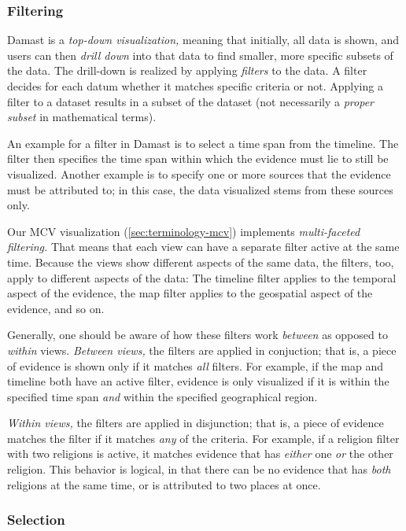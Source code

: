 \subsubsection{Filtering}
\label{sec:terminology-filtering}

Damast is a \emph{top-down visualization,} meaning that initially, all data is shown, and users can then \emph{drill down} into that data to find smaller, more specific subsets of the data.
The drill-down is realized by applying \emph{filters} to the data.
A filter decides for each datum whether it matches specific criteria or not.
Applying a filter to a dataset results in a subset of the dataset (not necessarily a \emph{proper subset} in mathematical terms).

An example for a filter in Damast is to select a time span from the timeline.
The filter then specifies the time span within which the evidence must lie to still be visualized.
Another example is to specify one or more sources that the evidence must be attributed to;
in this case, the data visualized stems from these sources only.

Our MCV visualization (\cref{sec:terminology-mcv}) implements \emph{multi-faceted filtering.}
That means that each view can have a separate filter active at the same time.
Because the views show different aspects of the same data, the filters, too, apply to different aspects of the data:
The timeline filter applies to the temporal aspect of the evidence, the map filter applies to the geospatial aspect of the evidence, and so on.

Generally, one should be aware of how these filters work \emph{between} as opposed to \emph{within} views.
\emph{Between views,} the filters are applied in conjuction;
that is, a piece of evidence is shown only if it matches \emph{all} filters.
For example, if the map and timeline both have an active filter, evidence is only visualized if it is within the specified time span \emph{and} within the specified geographical region.

\emph{Within views,} the filters are applied in disjunction; that is, a piece of evidence matches the filter if it matches \emph{any} of the criteria.
For example, if a religion filter with two religions is active, it matches evidence that has \emph{either} one \emph{or} the other religion.
This behavior is logical, in that there can be no evidence that has \emph{both} religions at the same time, or is attributed to two places at once.

\subsubsection{Selection}
\label{sec:terminology-selection}

